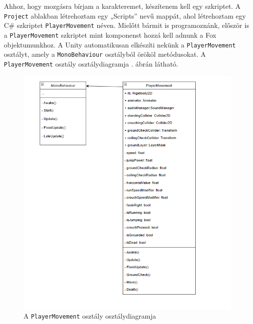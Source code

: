 \newpage
{}

Ahhoz, hogy mozgásra bírjam a karakteremet, készítenem kell egy szkriptet. A \texttt{Project} ablakban létrehoztam egy „Scripts” nevű mappát, ahol létrehoztam egy C\# szkriptet \texttt{PlayerMovement} néven. Mielőtt bármit is programoznánk, először is a \texttt{PlayerMovement} szkriptet mint komponenst hozzá kell adnunk a Fox objektumunkhoz. A Unity automatikusan elkészíti nekünk a \texttt{PlayerMovement} osztályt, amely a \texttt{MonoBehaviour} osztályból örököl metódusokat. A \texttt{PlayerMovement} osztály osztálydiagramja . ábrán látható. 

\begin{figure}[ht]
\centering
\includegraphics[scale = 0.8]{images/playerclass.png}
\caption{A \texttt{PlayerMovement} osztály osztálydiagramja}
\label{fig:playermovementclass}
\end{figure}

